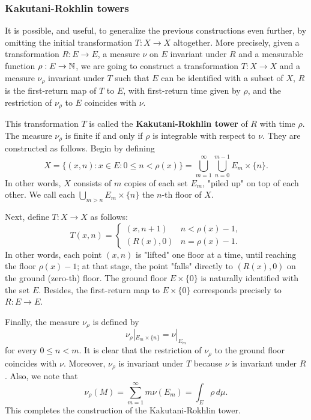 \subsubsection{Kakutani-Rokhlin towers}
It is possible, and useful, to generalize the previous constructions even further, by omitting the initial transformation $T:X\to X$ altogether. More precisely, given a transformation $R:E\to E$, a measure $\nu$ on $E$ invariant under $R$ and a measurable function $\rho:E\to\mathbb{N}$, we are going to construct a transformation $T:X\to X$ and a measure $\nu_\rho$ invariant under $T$ such that $E$ can be identified with a subset of $X$, $R$ is the first-return map of $T$ to $E$, with first-return time given by $\rho$, and the restriction of $\nu_\rho$ to $E$ coincides with $\nu$.\par
This transformation $T$ is called the \textbf{Kakutani-Rokhlin tower} of $R$ with time $\rho$. The measure $\nu_\rho$ is finite if and only if $\rho$ is integrable with respect to $\nu$. They are constructed as follows. Begin by defining
\[X=\{(x,n):x\in E:0\leq n<\rho(x)\}=\bigcup_{m=1}^{\infty}\bigcup_{n=0}^{m-1}E_m\times\{n\}.\]
In other words, $X$ consists of $m$ copies of each set $E_m$, "piled up" on top of each other. We call each $\bigcup_{m>n}E_m\times\{n\}$ the $n$-th floor of $X$.\par
Next, define $T:X\to X$ as follows:
\[T(x,n)=\begin{cases}
(x,n+1)&n<\rho(x)-1,\\
(R(x),0)&n=\rho(x)-1.
\end{cases}\]
In other words, each point $(x,n)$ is "lifted" one floor at a time, until reaching the floor $\rho(x)-1$; at that stage, the point "falls" directly to $(R(x),0)$ on the ground (zero-th) floor. The ground floor $E\times\{0\}$ is naturally identified with the set $E$. Besides, the first-return map to $E\times\{0\}$ corresponds precisely to $R:E\to E$.\par
Finally, the measure $\nu_\rho$ is defined by
\[\nu_\rho|_{E_m\times\{n\}}=\nu|_{E_m}\]
for every $0\leq n<m$. It is clear that the restriction of $\nu_\rho$ to the ground floor coincides with $\nu$. Moreover, $\nu_\rho$ is invariant under $T$ because $\nu$ is invariant under $R$. Also, we note that
\[\nu_\rho(M)=\sum_{m=1}^{\infty}m\nu(E_m)=\int_E\rho\,d\mu.\]
This completes the construction of the Kakutani-Rokhlin tower.

